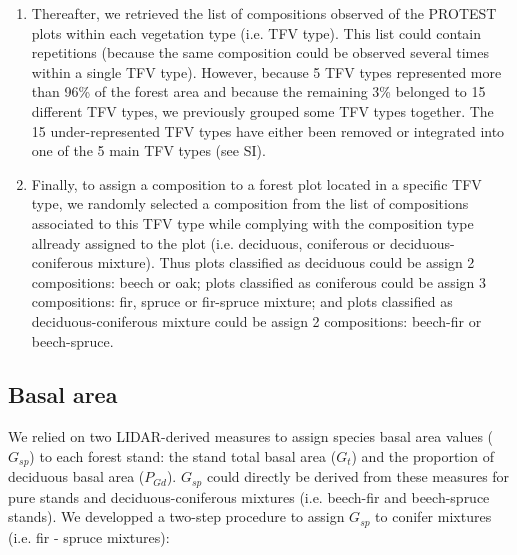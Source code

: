 \documentclass[a4paper]{article}
\begin{document}
\begin{enumerate}
    \item Thereafter, we retrieved the list of compositions observed of the PROTEST plots within each vegetation type (i.e. TFV type). This list could contain repetitions (because the same composition could be observed several times within a single TFV type). However, because 5 TFV types represented more than 96\% of the forest area and because the remaining 3\% belonged to 15 different TFV types, we previously grouped some TFV types together. The 15 under-represented TFV types have either been removed or integrated into one of the 5 main TFV types (see SI).

    \item Finally, to assign a composition to a forest plot located in a specific TFV type, we randomly selected a composition from the list of compositions associated to this TFV type while complying with the composition type allready assigned to the plot (i.e. deciduous, coniferous or deciduous-coniferous mixture). Thus plots classified as deciduous could be assign 2 compositions: beech or oak; plots classified as coniferous could be assign 3 compositions: fir, spruce or fir-spruce mixture; and plots classified as deciduous-coniferous mixture could be assign 2 compositions: beech-fir or beech-spruce.

\end{enumerate}


\subsection*{Basal area}

\noindent We relied on two LIDAR-derived measures to assign species basal area values ($G_{sp}$) to each forest stand: the stand total basal area ($G_t$) and the proportion of deciduous basal area ($P_{Gd}$). $G_{sp}$ could directly be derived from these measures for pure stands and deciduous-coniferous mixtures (i.e. beech-fir and beech-spruce stands). We developped a two-step procedure to assign $G_{sp}$ to conifer mixtures (i.e. fir - spruce mixtures):
\end{document}
